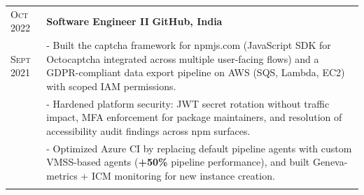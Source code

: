 \documentclass[a4paper,10pt]{extarticle}
\begin{document}
\begin{tabularx}{\linewidth}{ l | X }

\textsc{Oct 2022} & \textbf{Software Engineer II} \hfill \textbf{GitHub, India} \\
\textsc{Sept 2021} & \small{- Built the captcha framework for npmjs.com (JavaScript SDK for Octocaptcha integrated across multiple user-facing flows) and a GDPR-compliant data export pipeline on AWS (SQS, Lambda, EC2) with scoped IAM permissions.} \\
& \small{- Hardened platform security: JWT secret rotation without traffic impact, MFA enforcement for package maintainers, and resolution of accessibility audit findings across npm surfaces.} \\
& \small{- Optimized Azure CI by replacing default pipeline agents with custom VMSS-based agents (\textbf{+50\%} pipeline performance), and built Geneva-metrics + ICM monitoring for new instance creation.} \\
\multicolumn{2}{c}{} \\



\end{tabularx}
\end{document}
